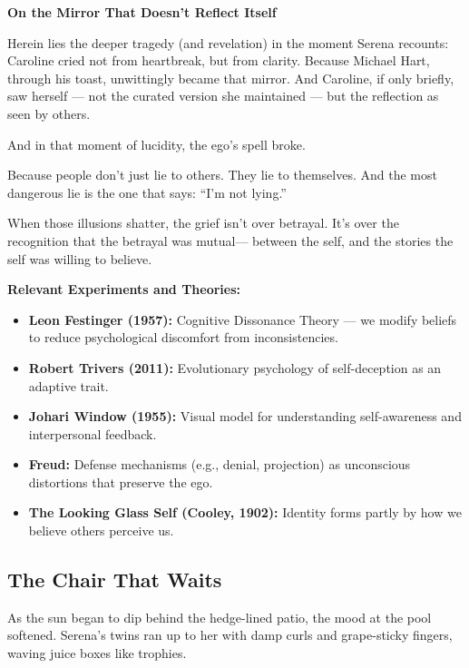 \begin{PsychologicalSidebar}{\textbf{On the Mirror That Doesn't Reflect Itself}}
\medskip
  
  Herein lies the deeper tragedy (and revelation) in the moment Serena recounts: Caroline cried not from heartbreak, 
  but from clarity. Because Michael Hart, through his toast, unwittingly became that mirror. And Caroline, if only 
  briefly, saw herself --- not the curated version she maintained --- but the reflection as seen by others.
  
\medskip
  
  And in that moment of lucidity, the ego’s spell broke.

\medskip
  
  Because people don’t just lie to others.
  They lie to themselves.
  And the most dangerous lie is the one that says: “I’m not lying.”

\medskip
  
  When those illusions shatter, the grief isn’t over betrayal.
  It’s over the recognition that the betrayal was mutual—
  between the self, and the stories the self was willing to believe.
  
  \vspace{1em}
  \noindent\textbf{Relevant Experiments and Theories:}
  \begin{itemize}
  \item \textbf{Leon Festinger (1957):} Cognitive Dissonance Theory — we modify beliefs to reduce psychological discomfort 
  from inconsistencies.
  \item \textbf{Robert Trivers (2011):} Evolutionary psychology of self-deception as an adaptive trait.
  \item \textbf{Johari Window (1955):} Visual model for understanding self-awareness and interpersonal feedback.
  \item \textbf{Freud:} Defense mechanisms (e.g., denial, projection) as unconscious distortions that preserve the ego.
  \item \textbf{The Looking Glass Self (Cooley, 1902):} Identity forms partly by how we believe others perceive us.
  \end{itemize}
\end{PsychologicalSidebar}

\medskip

\subsection{The Chair That Waits}

As the sun began to dip behind the hedge-lined patio, the mood at the pool softened. Serena’s twins ran up to her with damp curls and grape-sticky fingers, waving juice boxes like trophies.

